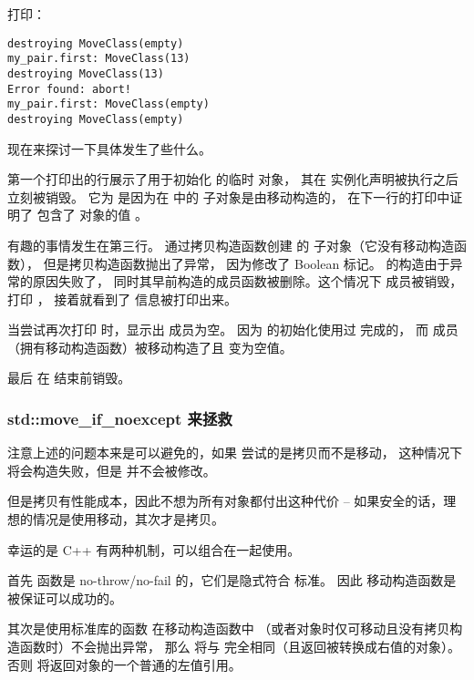 \documentclass[../../LearnCpp.tex]{subfiles}
\begin{document}
打印：

\begin{lstlisting}
destroying MoveClass(empty)
my_pair.first: MoveClass(13)
destroying MoveClass(13)
Error found: abort!
my_pair.first: MoveClass(empty)
destroying MoveClass(empty)
\end{lstlisting}

现在来探讨一下具体发生了些什么。

第一个打印出的行展示了用于初始化  的临时  对象，
其在  实例化声明被执行之后立刻被销毁。
它为  是因为在  中的  子对象是由移动构造的，
在下一行的打印中证明了  包含了  对象的值 。

有趣的事情发生在第三行。
通过拷贝构造函数创建  的  子对象（它没有移动构造函数），
但是拷贝构造函数抛出了异常，
因为修改了 Boolean 标记。 的构造由于异常的原因失败了，
同时其早前构造的成员函数被删除。这个情况下  成员被销毁，
打印 ，
接着就看到了  信息被打印出来。

当尝试再次打印  时，显示出  成员为空。
因为  的初始化使用过  完成的，
而  成员（拥有移动构造函数）被移动构造了且  变为空值。

最后  在  结束前销毁。

\subsubsection*{std::move\_if\_noexcept 来拯救}

注意上述的问题本来是可以避免的，如果  尝试的是拷贝而不是移动，
这种情况下  将会构造失败，但是  并不会被修改。

但是拷贝有性能成本，因此不想为所有对象都付出这种代价 --
如果安全的话，理想的情况是使用移动，其次才是拷贝。

幸运的是 C++ 有两种机制，可以组合在一起使用。

首先  函数是 no-throw/no-fail 的，它们是隐式符合  标准。
因此  移动构造函数是被保证可以成功的。

其次是使用标准库的函数  在移动构造函数中
（或者对象时仅可移动且没有拷贝构造函数时）不会抛出异常，
那么  将与  完全相同（且返回被转换成右值的对象）。
否则  将返回对象的一个普通的左值引用。
\end{document}
